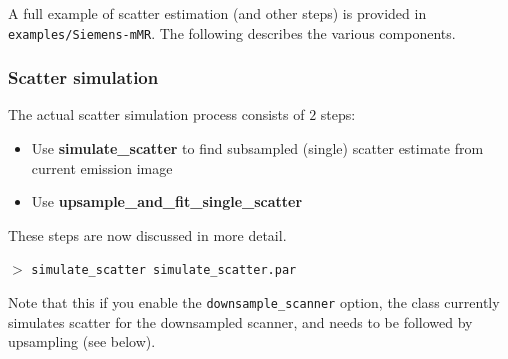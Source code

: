\documentclass{article}
\newcommand{\cmdline}[1]{\par \noindent $>$ \texttt{#1}\par}
\begin{document}
A full example of scatter estimation (and other steps) is provided in \texttt{examples/Siemens-mMR}.
The following describes the various components.

\subsubsection{Scatter simulation}
The actual scatter simulation process consists of $2$ steps:
\begin{itemize} 
\item Use \textbf{simulate\_scatter} to find subsampled (single) scatter estimate from current emission image
\item Use \textbf{upsample\_and\_fit\_single\_scatter}
\end{itemize} 
These steps are now discussed in more detail.\\[1cm]

\cmdline{simulate\_scatter simulate\_scatter.par}
Note that this if you enable the \texttt{downsample\_scanner} option, the class currently simulates
scatter for the downsampled scanner, and needs to be followed by upsampling (see below).
\end{document}

